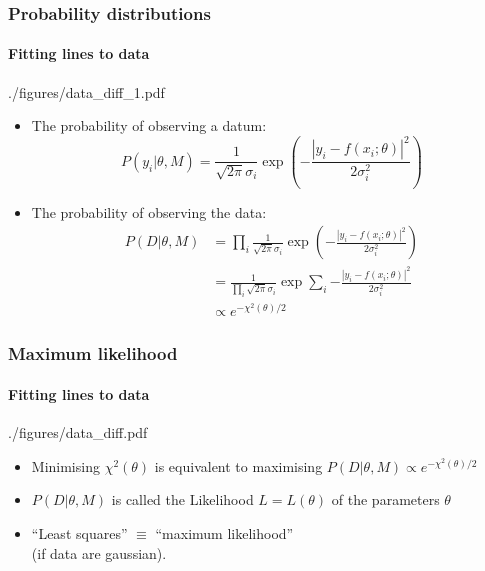 \documentclass[%
]{beamer}
\begin{document}
\begin{frame}
    \frametitle{Probability distributions}
    \framesubtitle{Fitting lines to data}
    \begin{figright}[0.6]{./figures/data_diff_1.pdf}
        \begin{itemize}
            \item The probability of observing a datum:
                \[
                    P(y_i | \theta,M) = \frac{1}{\sqrt{2\pi}\sigma_i}\exp\left({-\frac{|y_i-f(x_i;\theta)|^2}{2\sigma_i^2}}\right)
                \]
            \item The probability of observing the data:
                \begin{align}
                    P(D | \theta,M) &= \prod_i \frac{1}{\sqrt{2\pi}\sigma_i}\exp\left({-\frac{|y_i-f(x_i;\theta)|^2}{2\sigma_i^2}}\right) \nonumber\\
                    &=  \frac{1}{\prod_i\sqrt{2\pi}\sigma_i}\exp\sum_i{-\frac{|y_i-f(x_i;\theta)|^2}{2\sigma_i^2}} \nonumber\\
                    &\propto e^{-\chi^2(\theta)/2}
                    \nonumber
                \end{align}
        \end{itemize}
    \end{figright}
\end{frame}



\begin{frame}
    \frametitle{Maximum likelihood}
    \framesubtitle{Fitting lines to data}
    \begin{figleft}[0.6]{./figures/data_diff.pdf}
        \begin{itemize}
            \item Minimising $\chi^2(\theta)$  is equivalent to maximising $P(D|\theta,M) \propto e^{-\chi^2(\theta)/2}$
            \item $P(D|\theta,M)$ is called the Likelihood $L=L(\theta)$ of the parameters $\theta$
            \item ``Least squares'' $\equiv$ ``maximum likelihood'' \\(if data are gaussian).
        \end{itemize}
    \end{figleft}
\end{frame}
\end{document}
